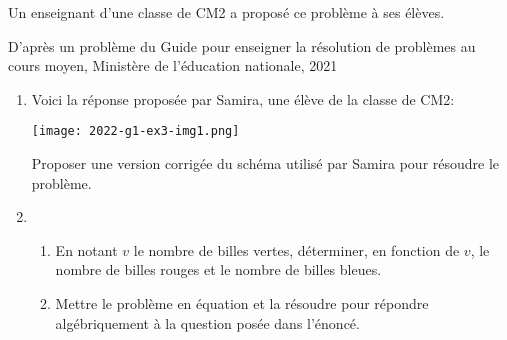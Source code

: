 Un enseignant d'une classe de CM2 a proposé ce problème à ses élèves.

\medskip
{}


\begin{flushright}
\scriptsize D'après un problème du Guide pour enseigner la résolution de problèmes au cours moyen, Ministère de l'éducation nationale, 2021	
\end{flushright}


\begin{enumerate}
  \item Voici la réponse proposée par Samira, une élève de la classe de CM2:
\begin{center}
	\texttt{[image: 2022-g1-ex3-img1.png]}	
\end{center}

Proposer une version corrigée du schéma utilisé par Samira pour résoudre le problème. 

\medskip
\item 
	\begin{enumerate}
		\item En notant $v$ le nombre de billes vertes, déterminer, en fonction de $v$, le nombre de billes rouges et le nombre de billes bleues.
		\item Mettre le problème en équation et la résoudre pour répondre algébriquement à la question posée dans l'énoncé.
	\end{enumerate} 
\end{enumerate}